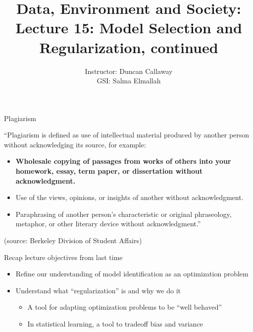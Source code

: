 \documentclass[mathserif, handout, aspectratio=169]{beamer}
\title[Lecture 15] %
{Data, Environment and Society: \\{Lecture 15: Model Selection and Regularization, continued}}
\author[ER190C: Data, Environment and Society] 
{Instructor: Duncan Callaway\\
GSI: Salma Elmallah}
\institute[UC Berkeley] %
 {\small{ \bf October 22, 2019}}
\date[October 22, 2019]
\begin{document}
\frame{
  \titlepage
}

\begin{frame}{Plagiarism}

``Plagiarism is defined as use of intellectual material produced by another person without acknowledging its source, for example:
 
\begin{itemize}
	\item \textbf{Wholesale copying of passages from works of others into your homework, essay, term paper, or dissertation without acknowledgment.}
	\item Use of the views, opinions, or insights of another without acknowledgment.
	\item Paraphrasing of another person’s characteristic or original phraseology, metaphor, or other literary device without acknowledgment.''
\end{itemize}
 (source: Berkeley Division of Student Affairs)
\end{frame}

\begin{frame}{Recap lecture objectives from last time}
\begin{itemize}
\item Refine our understanding of model identification as an optimization problem
\item<4-> Understand what ``regularization'' is and why we do it
\begin{itemize}
\item<5-> A tool for adapting optimization problems to be ``well behaved''
\item<5-> In statistical learning, a tool to tradeoff bias and variance
\end{itemize}

\end{itemize}
\end{frame}
\end{document}
